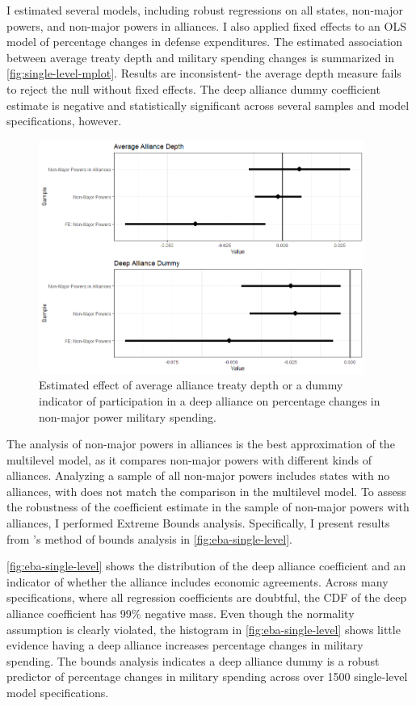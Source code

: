 \documentclass[12pt]{article}
\begin{document}
I estimated several models, including robust regressions on all states, non-major powers, and non-major powers in alliances. 
I also applied fixed effects to an OLS model of percentage changes in defense expenditures. 
The estimated association between average treaty depth and military spending changes is summarized in \autoref{fig:single-level-mplot}. 
Results are inconsistent- the average depth measure fails to reject the null without fixed effects. 
The deep alliance dummy coefficient estimate is negative and statistically significant across several samples and model specifications, however. 

\begin{figure}[htbp]
	\centering
		\includegraphics[width=0.95\textwidth]{single-level-mplot.png}
	\caption{Estimated effect of average alliance treaty depth or a dummy indicator of participation in a deep alliance on percentage changes in non-major power military spending.}
	\label{fig:single-level-mplot}
\end{figure}


The analysis of non-major powers in alliances is the best approximation of the multilevel model, as it compares non-major powers with different kinds of alliances. 
Analyzing a sample of all non-major powers includes states with no alliances, with does not match the comparison in the multilevel model. 
To assess the robustness of the coefficient estimate in the sample of non-major powers with alliances, I performed Extreme Bounds analysis. 
Specifically, I present results from \citet{Sala-i-Martin1997}'s method of bounds analysis in \autoref{fig:eba-single-level}. 


\autoref{fig:eba-single-level} shows the distribution of the deep alliance coefficient and an indicator of whether the alliance includes economic agreements. 
Across many specifications, where all regression coefficients are doubtful, the CDF of the deep alliance coefficient has 99\% negative mass. 
Even though the normality assumption is clearly violated, the histogram in \autoref{fig:eba-single-level} shows little evidence having a deep alliance increases percentage changes in military spending. 
The bounds analysis indicates a deep alliance dummy is a robust predictor of percentage changes in military spending across over 1500 single-level model specifications. 
\end{document}
